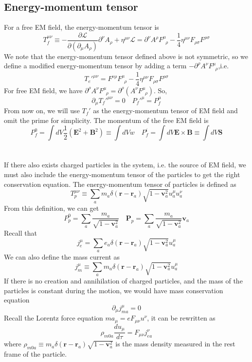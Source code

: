 \subsection{Energy-momentum tensor}
For a free EM field, the energy-momentum tensor is
\[T_f^{\mu \nu} \equiv -\frac{\partial \mathcal{L}}{\partial(\partial_{\mu}A_{\rho})} \partial^{\nu} A_{\rho} + \eta^{\mu \nu} \mathcal{L} = \partial^{\nu}A^{\rho} F^{\mu}_{\phantom{\rho}\rho}-\frac{1}{4}\eta^{\mu\nu}F_{\rho\sigma}F^{\rho\sigma}\]
We note that the energy-momentum tensor defined above is not symmetric, so we define a modified energy-momentum tensor by adding a term $-\partial^{\rho}A^{\nu}F^{\mu}_{\phantom{\rho}\rho}$,i.e.
\[T_e'^{\mu\nu} = F^{\nu\rho}F^{\mu}_{\phantom{\rho}\rho}-\frac{1}{4}\eta^{\mu\nu}F_{\rho\sigma}F^{\rho\sigma}\]
For free EM field, we have $\partial^{\rho}A^{\nu}F^{\mu}_{\phantom{\rho}\rho} = \partial^{\rho}\left(A^{\nu} F^{\mu}_{\phantom{\rho}\rho}\right)$.
So,
\[\partial_{\mu}T_f'^{\mu\nu} = 0 \quad P_f'^{\mu} = P_f^{\mu}\]
From now on, we will use $T_f'$ as the energy-momentum tensor of EM field and omit the prime for simplicity.
The momentum of the free EM field is
\[P_f^{0} = \int dV \frac{1}{2}(\bm{E}^2+\bm{B}^2) \equiv \int dV w \quad P_f^{i} = \int dV \bm{E} \times \bm{B} \equiv \int dV \bm{S}\]
\\ \\
If there also exists charged particles in the system, i.e. the source of EM field, we must also include the energy-momentum tensor of the particles to get the right conservation equation. The energy-momentum tensor of particles is defined as
\[T_p^{\mu\nu} \equiv \sum_a m_a \delta(\bm{r}-\bm{r}_a) \sqrt{1-\bm{v}_a^2} u_a^\mu u_a^{\nu}\]
From this definition, we can get
\[P_p^0 = \sum_a \frac{m_a}{\sqrt{1-\bm{v}_a^2}} \quad \bm{P}_p =  \sum_a \frac{m_a}{\sqrt{1-\bm{v}_a^2}} \bm{v}_a\]
Recall that
\[j^{\mu}_e = \sum_a e_a \delta(\bm{r}-\bm{r}_a) \sqrt{1-\bm{v}_a^2} u_a^\mu \]
We can also define the mass current as
\[j^{\mu}_m \equiv \sum_a m_a \delta(\bm{r}-\bm{r}_a) \sqrt{1-\bm{v}_a^2} u_a^\mu \]
If there is no creation and annihilation of charged particles, and the mass of the particles is constant during the motion, we would have mass conservation equation
\[\partial_{\mu} j^{\mu}_{ma} = 0\]
Recall the Lorentz force equation $m a_{\mu} = eF_{\mu\nu}u^{\nu}$, it can be rewritten as
\[\rho_{m0a} \frac{du_{\mu}}{d\tau} = F_{\mu\nu}j_{ea}^{\nu}\]
where $\rho_{m0a} \equiv m_a \delta(\bm{r}-\bm{r}_a) \sqrt{1-\bm{v}_a^2}$ is the mass density measured in the rest frame of the particle.
\\
